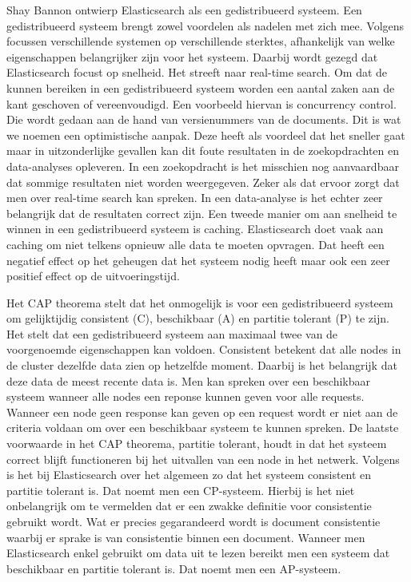 Shay Bannon ontwierp Elasticsearch als een gedistribueerd systeem. Een gedistribueerd systeem brengt zowel voordelen als nadelen met zich mee. Volgens \textcite{Brasetvik2013} focussen verschillende systemen op verschillende sterktes, afhankelijk van welke eigenschappen belangrijker zijn voor het systeem. Daarbij wordt gezegd dat Elasticsearch focust op snelheid. Het streeft naar real-time search. Om dat de kunnen bereiken in een gedistribueerd systeem worden een aantal zaken aan de kant geschoven of vereenvoudigd. Een voorbeeld hiervan is concurrency control. Die wordt gedaan aan de hand van versienummers van de documents. Dit is wat we noemen een optimistische aanpak. Deze heeft als voordeel dat het sneller gaat maar in uitzonderlijke gevallen kan dit foute resultaten in de zoekopdrachten en data-analyses opleveren. In een zoekopdracht is het misschien nog aanvaardbaar dat sommige resultaten niet worden weergegeven. Zeker als dat ervoor zorgt dat men over real-time search kan spreken. In een data-analyse is het echter zeer belangrijk dat de resultaten correct zijn. Een tweede manier om aan snelheid te winnen in een gedistribueerd systeem is caching. Elasticsearch doet vaak aan caching om niet telkens opnieuw alle data te moeten opvragen. Dat heeft een negatief effect op het geheugen dat het systeem nodig heeft maar ook een zeer positief effect op de uitvoeringstijd.

Het CAP theorema stelt dat het onmogelijk is voor een gedistribueerd systeem om gelijktijdig consistent (C), beschikbaar (A) en partitie tolerant (P) te zijn. Het stelt dat een gedistribueerd systeem aan maximaal twee van de voorgenoemde eigenschappen kan voldoen. Consistent betekent dat alle nodes in de cluster dezelfde data zien op hetzelfde moment. Daarbij is het belangrijk dat deze data de meest recente data is. Men kan spreken over een beschikbaar systeem wanneer alle nodes een reponse kunnen geven voor alle requests. Wanneer een node geen response kan geven op een request wordt er niet aan de criteria voldaan om over een beschikbaar systeem te kunnen spreken. De laatste voorwaarde in het CAP theorema, partitie tolerant, houdt in dat het systeem correct blijft functioneren bij het uitvallen van een node in het netwerk. Volgens \textcite{Brasetvik2013} is het bij Elasticsearch over het algemeen zo dat het systeem consistent en partitie tolerant is. Dat noemt men een CP-systeem. Hierbij is het niet onbelangrijk om te vermelden dat er een zwakke definitie voor consistentie gebruikt wordt. Wat er precies gegarandeerd wordt is document consistentie waarbij er sprake is van consistentie binnen een document. Wanneer men Elasticsearch enkel gebruikt om data uit te lezen bereikt men een systeem dat beschikbaar en partitie tolerant is. Dat noemt men een AP-systeem.

